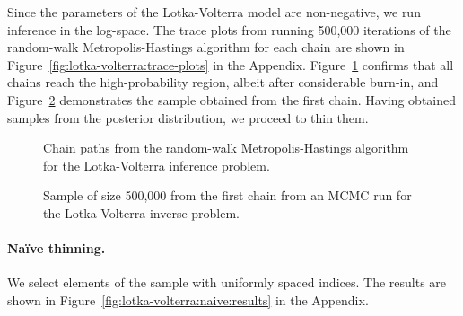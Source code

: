 \documentclass[11pt,a4paper]{report}
\begin{document}
Since the parameters of the Lotka-Volterra model are non-negative, we run inference in the log-space. The trace plots from running 500,000 iterations of the random-walk Metropolis-Hastings algorithm for each chain are shown in Figure~\ref{fig:lotka-volterra:trace-plots} in the Appendix. Figure~\ref{fig:lotka-volterra:chain-paths} confirms that all chains reach the high-probability region, albeit after considerable burn-in, and Figure~\ref{fig:lotka-volterra:chain1-sample} demonstrates the sample obtained from the first chain. Having obtained samples from the posterior distribution, we proceed to thin them.

\begin{figure}[h]
\centering
{}
\caption{Chain paths from the random-walk Metropolis-Hastings algorithm for the Lotka-Volterra inference problem.
\label{fig:lotka-volterra:chain-paths}}
\end{figure}

\begin{figure}[h]
\centering
{}
\caption{Sample of size 500,000 from the first chain from an MCMC run for the Lotka-Volterra inverse problem.
\label{fig:lotka-volterra:chain1-sample}}
\end{figure}

\paragraph{Na\"ive thinning.} We select elements of the sample with uniformly spaced indices. The results are shown in Figure~\ref{fig:lotka-volterra:naive:results} in the Appendix.
\end{document}
